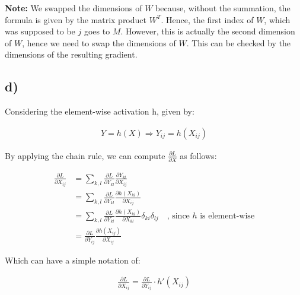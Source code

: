 \documentclass{article}
\begin{document}
\textbf{Note:} We swapped the dimensions of $W$ because, without the summation, the formula is given
by the matrix product $W^T$. Hence, the first index of $W$, which was supposed to be $j$ goes to $M$. However, this is
actually the second dimension of $W$, hence we need to swap the dimensions of $W$. This can be checked by the dimensions
of the resulting gradient.


\newpage
\subsection*{d)}

Considering the element-wise activation h, given by: 

\begin{align*}
    Y = h(X) \Rightarrow  Y_{ij} = h(X_{ij})
\end{align*}

By applying the chain rule, we can compute $\frac{\partial L}{\partial X}$ as follows:

\begin{align*}
    \frac{\partial L}{\partial X_{ij}} &= \sum_{k, l}\frac{\partial L}{\partial Y_{kl}} \frac{\partial Y_{kl}}{\partial X_{ij}} \\
    &= \sum_{k, l}\frac{\partial L}{\partial Y_{kl}} \frac{\partial h(X_{kl})}{\partial X_{ij}} \\
    &= \sum_{k, l}\frac{\partial L}{\partial Y_{kl}} \frac{\partial h(X_{kl})}{\partial X_{kl}} \delta_{ki} \delta_{lj} \quad \text{, since $h$ is element-wise} \\
    &= \frac{\partial L}{\partial Y_{ij}} \frac{\partial h(X_{ij})}{\partial X_{ij}}
\end{align*}

Which can have a simple notation of:

\begin{align*}
    \frac{\partial L}{\partial X_{ij}} = \frac{\partial L}{\partial Y_{ij}} \cdot h'(X_{ij})
\end{align*}
\end{document}
